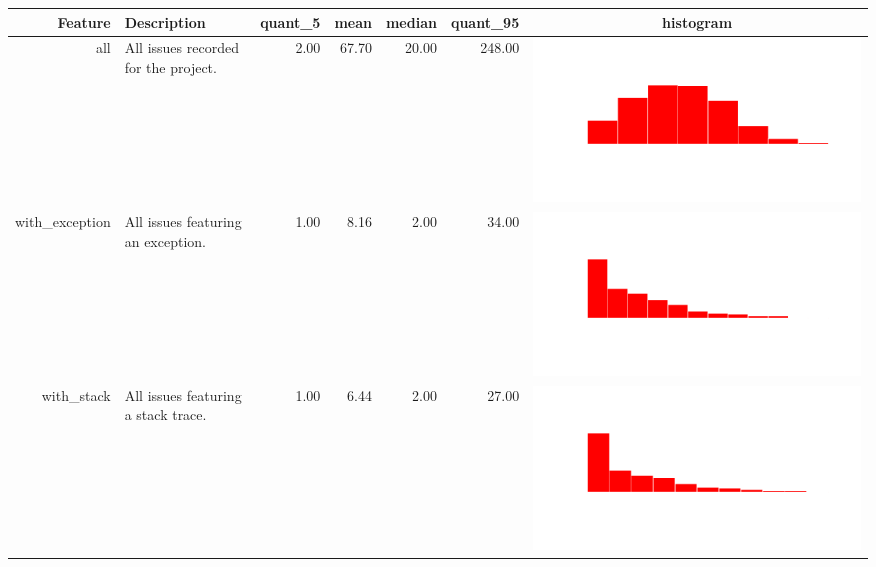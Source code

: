 \begin{table}[ht]
\centering
\begin{tabular}{rp{16em}rrrrc}
  \hline
Feature & Description & quant\_5 & mean & median & quant\_95 & histogram \\ 
  \hline
all & All issues recorded for the project. & 2.00 & 67.70 & 20.00 & 248.00 & \includegraphics[scale = 0.1, clip = true, trim= 50px 60px 50px 60px]{hist-5d4a87daa44c63097df9bb1f3506d541.pdf} \\ 
  with\_exception & All issues featuring an exception. & 1.00 & 8.16 & 2.00 & 34.00 & \includegraphics[scale = 0.1, clip = true, trim= 50px 60px 50px 60px]{hist-bf73235d0503f937ef6f36c28cf1ba0d.pdf} \\ 
  with\_stack & All issues featuring a stack trace. & 1.00 & 6.44 & 2.00 & 27.00 & \includegraphics[scale = 0.1, clip = true, trim= 50px 60px 50px 60px]{hist-528cb6be67074e6e2c22d11245920e13.pdf} \\ 

\end{tabular}
\end{table}
